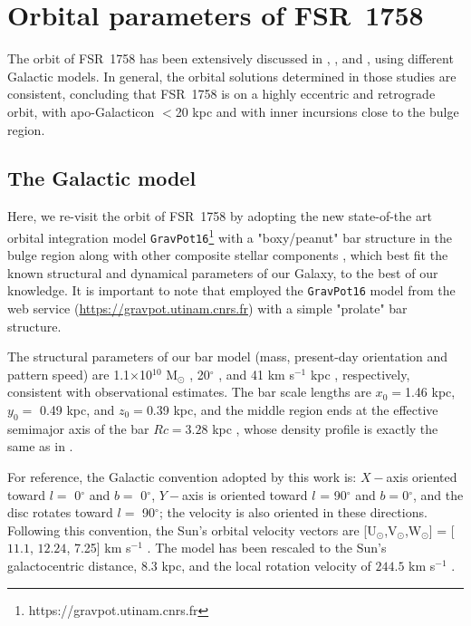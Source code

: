 \documentclass[longauth]{aa} %
\begin{document}
\section{Orbital parameters of FSR~1758}
\label{section6}

The orbit of  FSR~1758 has been extensively discussed in \citet{Villanova2019}, \citet{Simpson2019}, and \citet{Yeh2020}, using different Galactic models. In general, the orbital solutions determined in those studies are consistent, concluding that FSR~1758 is on a highly eccentric and retrograde orbit, with apo-Galacticon $<$20 kpc  and with inner incursions close to the bulge region. 

\subsection{The Galactic model}

Here, we re-visit the orbit of  FSR~1758 by adopting the new state-of-the art orbital integration model \texttt{GravPot16}\footnote{https://gravpot.utinam.cnrs.fr} with a "boxy/peanut" bar structure in the bulge region along with other composite stellar components \citep{FT_Dynamics}, which best fit the known structural and dynamical parameters of our Galaxy, to the best of our knowledge. It is important to note that \citet{Villanova2019} employed the \texttt{GravPot16} model from the web service (\url{https://gravpot.utinam.cnrs.fr}) with a simple "prolate" bar structure.  

The structural parameters of our bar model (mass, present-day orientation and pattern speed)  are 1.1$\times$10$^{10}$ M$_{\odot}$ \citep{FT_Dynamics}, 20$^{\circ}$ \citep{Rodriguez-Fernandez2008, FT_Dynamics}, and 41 km s$^{-1}$ kpc \citep{Sanders2019}, respectively, consistent with observational estimates. The bar scale lengths are $x_0=$1.46 kpc, $y_{0}=$ 0.49 kpc, and $z_0=$0.39 kpc, and the middle region ends at the effective semimajor axis of the bar $Rc = 3.28$ kpc , whose density profile is exactly the same as in \citet{Robin2012}.

For reference, the Galactic convention adopted by this work is: $X-$axis oriented toward $l=$ 0$^{\circ}$ and $b=$ 0$^{\circ}$, $Y-$axis is oriented toward $l$ = 90$^{\circ}$ and $b=$0$^{\circ}$, and the disc rotates toward $l=$ 90$^{\circ}$; the velocity is also oriented in these directions. Following this convention, the Sun's orbital velocity vectors are [U$_{\odot}$,V$_{\odot}$,W$_{\odot}$] = [$11.1$, $12.24$, 7.25] km s$^{-1}$ \citep{Brunthaler2011}. The model has been rescaled to the Sun's galactocentric distance, 8.3 kpc, and the local rotation velocity of $244.5$ km s$^{-1}$  \citep{Sofue2015}.
\end{document}
